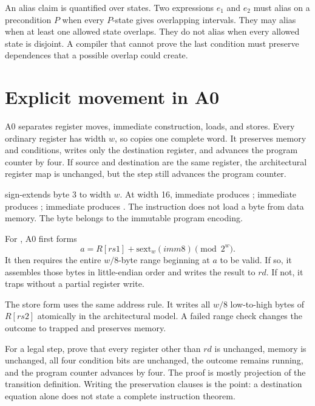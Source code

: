 An alias claim is quantified over states. Two expressions \(e_1\) and \(e_2\)
must alias on a precondition \(P\) when every \(P\)-state gives overlapping
intervals. They may alias when at least one allowed state overlaps. They do
not alias when every allowed state is disjoint. A compiler that cannot prove
the last condition must preserve dependences that a possible overlap could
create.

\section{Explicit movement in A0}

A0 separates register moves, immediate construction, loads, and stores. Every
ordinary register has width \(w\), so  copies one complete
word. It preserves memory and conditions, writes only the destination register,
and advances the program counter by four. If source and destination are the
same register, the architectural register map is unchanged, but the step still
advances the program counter.

 sign-extends byte 3 to width \(w\). At width 16,
immediate  produces ; immediate  produces
; immediate  produces . The instruction
does not load a byte from data memory. The byte belongs to the immutable
program encoding.

For , A0 first forms
\[
  a=R[rs1]+\mathrm{sext}_w(imm8)\pmod {2^w}.
\]
It then requires the entire \(w/8\)-byte range beginning at \(a\) to be
valid. If so, it assembles those bytes in little-endian order and writes the
result to \(rd\). If not, it traps without a partial register write.

The store form uses the same address rule. It writes all \(w/8\) low-to-high
bytes of \(R[rs2]\) atomically in the architectural model. A failed range
check changes the outcome to trapped and preserves memory.

\begin{proofkit}[title={A0 move preservation}]
For a legal  step, prove that every register other than
\(rd\) is unchanged, memory is unchanged, all four condition bits are
unchanged, the outcome remains running, and the program counter advances by
four. The proof is mostly projection of the transition definition. Writing
the preservation clauses is the point: a destination equation alone does not
state a complete instruction theorem.
\end{proofkit}

